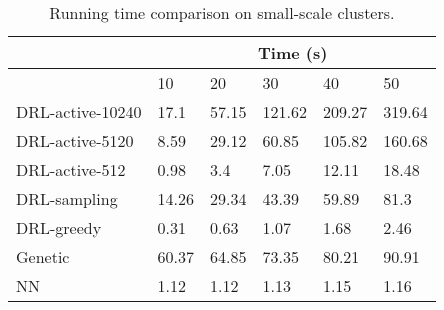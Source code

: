 \documentclass[journal]{IEEEtran}
\begin{document}
\begin{table}[t!]
	\centering
	\caption{Running time comparison on small-scale clusters.}
	\label{timesmall}
	 \begin{tabular}{p{2.75cm}<{\centering}|p{0.7cm}<{\centering}|p{0.7cm}<{\centering}|p{0.7cm}<{\centering}|p{0.7cm}<{\centering}|p{0.7cm}<{\centering}}
		\hline
	    & \multicolumn{5}{c}{Time (s)} \\
		\hline
	    \backslashbox{Algorithm}{$K$} & 10 & 20 & 30 & 40 & 50\\
		\hline
	    DRL-active-10240 & 17.1 & 57.15 & 121.62 & 209.27 & 319.64\\
		\hline
		DRL-active-5120 & 8.59 & 29.12 & 60.85 & 105.82 & 160.68\\
		\hline
		DRL-active-512 & 0.98 & 3.4 & 7.05 & 12.11 & 18.48\\
		\hline
		DRL-sampling & 14.26 & 29.34 & 43.39  & 59.89 & 81.3 \\
	    \hline
	    DRL-greedy & 0.31 & 0.63 & 1.07 & 1.68 & 2.46\\
	    \hline
	    Genetic & 60.37 & 64.85 & 73.35 & 80.21 & 90.91\\
	    \hline
	    NN & 1.12 & 1.12 & 1.13 & 1.15 & 1.16\\
	    \hline
		\end{tabular}
\end{table}
\end{document}
